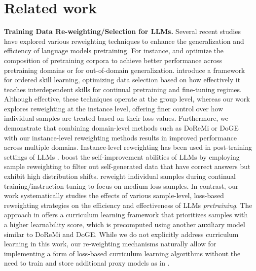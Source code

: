 \section{Related work}
\vspace{-3mm}
\textbf{Training Data Re-weighting/Selection for LLMs.}
Several recent studies \citep{xie2023doremi,chen2023skill,fan2023doge,thakkar2023self} have explored various reweighting techniques to enhance the generalization and efficiency of language models pretraining. For instance, \cite{xie2023doremi} and \cite{fan2023doge} optimize the composition of pretraining corpora to achieve better performance across pretraining domains or for out-of-domain generalization. \citet{chen2023skill} introduce a framework for ordered skill learning, optimizing data selection based on how effectively it teaches interdependent skills for continual pretraining and fine-tuning regimes. Although effective, these techniques operate at the group level, whereas our work explores reweighting at the instance level, offering finer control over how individual samples are treated based on their loss values. Furthermore, we demonstrate that combining domain-level methods such as DoReMi \citep{xie2023doremi} or DoGE \citep{fan2023doge} with our instance-level reweighting methods results in improved performance across multiple domains.
Instance-level reweighting has been used in post-training settings of LLMs \citep{chen2024take,jiang2024importance}. \citet{jiang2024importance} boost the self-improvement abilities of LLMs by employing sample reweighting to filter out self-generated data that have correct answers but exhibit high distribution shifts. \cite{chen2024take} reweight individual samples during continual training/instruction-tuning to focus on medium-loss samples. In contrast, our work systematically studies the effects of various sample-level, loss-based reweighting strategies on the efficiency and effectiveness of LLMs \emph{pretraining}.
The approach in \cite{fan2023irreducible} offers a curriculum learning framework that prioritizes samples with a higher learnability score, which is precomputed using another auxiliary model similar to DoReMi and DoGE. While we do not explicitly address curriculum learning in this work, our re-weighting mechanisms naturally allow for implementing a form of loss-based curriculum learning algorithms without the need to train and store additional proxy models as in \cite{fan2023irreducible}. 

